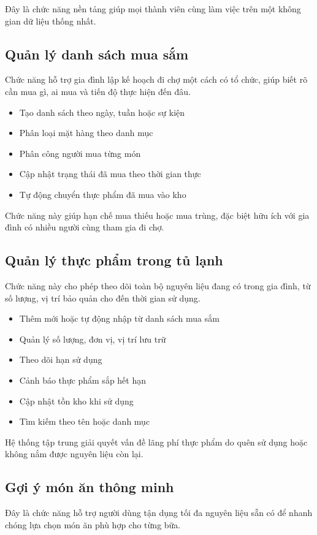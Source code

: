 \documentclass[12pt,a4paper]{report}
\begin{document}
Đây là chức năng nền tảng giúp mọi thành viên cùng làm việc trên một không gian dữ liệu thống nhất.  

\subsection{Quản lý danh sách mua sắm}
Chức năng hỗ trợ gia đình lập kế hoạch đi chợ một cách có tổ chức, giúp biết rõ cần mua gì, ai mua và tiến độ thực hiện đến đâu.  

\begin{itemize}
    \item Tạo danh sách theo ngày, tuần hoặc sự kiện 
    \item Phân loại mặt hàng theo danh mục 
    \item Phân công người mua từng món 
    \item Cập nhật trạng thái đã mua theo thời gian thực 
    \item Tự động chuyển thực phẩm đã mua vào kho 
\end{itemize}

Chức năng này giúp hạn chế mua thiếu hoặc mua trùng, đặc biệt hữu ích với gia đình có nhiều người cùng tham gia đi chợ.  

\subsection{Quản lý thực phẩm trong tủ lạnh}
Chức năng này cho phép theo dõi toàn bộ nguyên liệu đang có trong gia đình, từ số lượng, vị trí bảo quản cho đến thời gian sử dụng.  

\begin{itemize}
    \item Thêm mới hoặc tự động nhập từ danh sách mua sắm 
    \item Quản lý số lượng, đơn vị, vị trí lưu trữ 
    \item Theo dõi hạn sử dụng 
    \item Cảnh báo thực phẩm sắp hết hạn 
    \item Cập nhật tồn kho khi sử dụng 
    \item Tìm kiếm theo tên hoặc danh mục 
\end{itemize}

Hệ thống tập trung giải quyết vấn đề lãng phí thực phẩm do quên sử dụng hoặc không nắm được nguyên liệu còn lại.  

\subsection{Gợi ý món ăn thông minh}
Đây là chức năng hỗ trợ người dùng tận dụng tối đa nguyên liệu sẵn có để nhanh chóng lựa chọn món ăn phù hợp cho từng bữa.  
\end{document}
